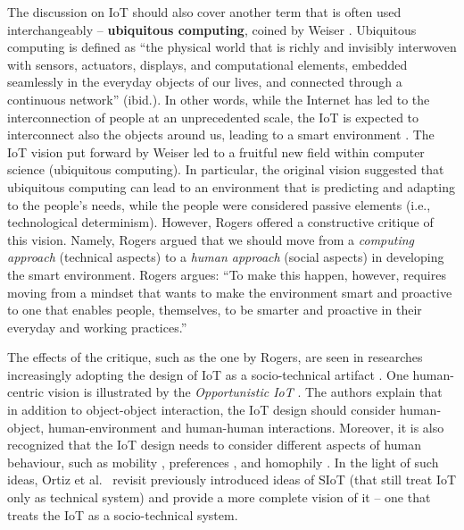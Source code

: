 The discussion on IoT should also cover another term that is often used interchangeably -- \textbf{ubiquitous computing}, coined by Weiser \cite{weiser1991computer}. Ubiquitous computing is defined as ``the physical world that is richly and invisibly interwoven with sensors, actuators, displays, and computational elements, embedded seamlessly in the everyday objects of our lives, and connected through a continuous network'' (ibid.). In other words, while the Internet has led to the interconnection of people at an unprecedented scale, the IoT is expected to interconnect also the objects around us, leading to a smart environment \cite{gubbi2013internet}. %
The IoT vision put forward by Weiser \cite{weiser1991computer} led to a fruitful new field within computer science (ubiquitous computing). In particular, the original vision suggested that ubiquitous computing can lead to an environment that is predicting and adapting to the people's needs, while the people were considered passive elements (i.e., technological determinism). However, Rogers \cite{rogers2006moving} offered a constructive critique of this vision. Namely, Rogers argued that we should move from a \textit{computing approach} (technical aspects) to a \textit{human approach} (social aspects) in developing the smart environment. Rogers argues: ``To make this happen, however, requires moving from a mindset that wants to make the environment smart and proactive to one that enables people, themselves, to be smarter and proactive in their everyday and working practices.''

The effects of the critique, such as the one by Rogers, are seen in researches increasingly adopting the design of IoT as a socio-technical artifact \cite{ning2011future,guo2012opportunistic,Shin2014,tomasini2017effect}. One human-centric vision is illustrated by the \textit{Opportunistic IoT} \cite{guo2012opportunistic,guo2013opportunistic}. The authors explain that in addition to object-object interaction, the IoT design should consider human-object, human-environment and human-human interactions. Moreover, it is also recognized that the IoT design needs to consider different aspects of human behaviour, such as mobility \cite{tomasini2017effect}, preferences \cite{kowshalya2016community}, and homophily \cite{atzori2012social}. In the light of such ideas, Ortiz et al.\ \cite{ortiz2014cluster} revisit previously introduced ideas of {SIoT} (that still treat IoT only as technical system) and provide a more complete vision of it -- one that treats the IoT as a socio-technical system.


